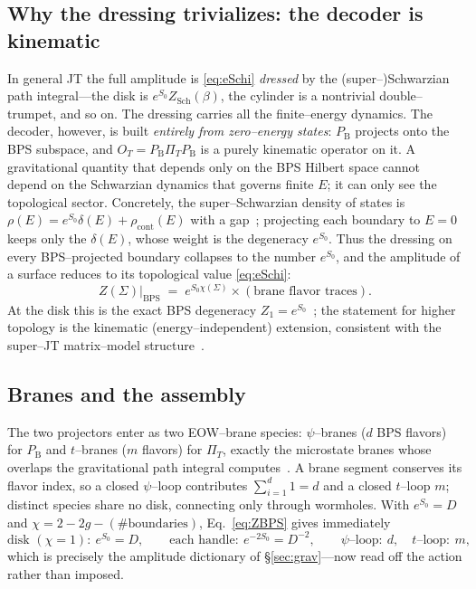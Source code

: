 \documentclass[11pt]{article}
\newcommand{\PB}{P_{\mathrm B}}
\newcommand{\PiT}{\Pi_T}
\newcommand{\OT}{O_T}
\newif\ifpedagogical
\newcommand{\ped}[1]{\ifpedagogical\par\smallskip{\small\color{pedcol}%
  \leftskip=1.4em\rightskip=1.4em\noindent$\triangleright$~\textit{Plain-language aside.}~#1\par}%
  \par\smallskip\fi}
\begin{document}
\subsection{Why the dressing trivializes: the decoder is kinematic}
In general JT the full amplitude is \eqref{eq:eSchi} \emph{dressed} by the (super--)Schwarzian path
integral---the disk is $e^{S_0}Z_{\text{Sch}}(\beta)$, the cylinder is a nontrivial
double--trumpet, and so on. The dressing carries all the finite--energy dynamics. The decoder,
however, is built \emph{entirely from zero--energy states}: $\PB$ projects onto the BPS subspace,
and $\OT=\PB\PiT\PB$ is a purely kinematic operator on it. A gravitational quantity that depends
only on the BPS Hilbert space cannot depend on the Schwarzian dynamics that governs finite $E$; it
can only see the topological sector. Concretely, the super--Schwarzian density of states is
$\rho(E)=e^{S_0}\delta(E)+\rho_{\text{cont}}(E)$ with a gap~\cite{HITZ,N2matrix,BPSmicro};
projecting each boundary to $E=0$ keeps only the $\delta(E)$, whose weight is the degeneracy
$e^{S_0}$.
\ped{The ``super--Schwarzian'' is the theory that lives on the boundary of super--JT; its density of
states $\rho(E)$ tells you how many states sit at each energy. The picture is a spike of $e^{S_0}$
exactly--zero--energy (BPS) states---the $\delta(E)$---then a gap, then an ordinary continuum. Our
decoder only ever asks about the spike, so all the continuum dynamics drops out and only the count
$e^{S_0}$ remains. That is what ``the dressing trivializes'' means.} Thus the dressing on every BPS--projected boundary collapses to the number $e^{S_0}$, and
the amplitude of a surface reduces to its topological value \eqref{eq:eSchi}:
\begin{equation}
  Z(\Sigma)\big|_{\text{BPS}} \;=\; e^{S_0\chi(\Sigma)}\times(\text{brane flavor traces}).
  \label{eq:ZBPS}
\end{equation}
At the disk this is the exact BPS degeneracy $Z_1=e^{S_0}$~\cite{HITZ,BPSmicro}; the statement for
higher topology is the kinematic (energy--independent) extension, consistent with the super--JT
matrix--model structure~\cite{N2matrix}.

\subsection{Branes and the assembly}
The two projectors enter as two EOW--brane species: $\psi$--branes ($d$ BPS flavors) for $\PB$ and
$t$--branes ($m$ flavors) for $\PiT$, exactly the microstate branes whose overlaps the gravitational
path integral computes~\cite{BPSmicro,PSSY}. A brane segment conserves its flavor index, so a closed
$\psi$--loop contributes $\sum_{i=1}^d 1=d$ and a closed $t$--loop $m$; distinct species share no
disk, connecting only through wormholes. With $e^{S_0}=D$ and $\chi=2-2g-(\#\text{boundaries})$,
Eq.~\eqref{eq:ZBPS} gives immediately
\begin{equation}
  \text{disk }(\chi{=}1):\ e^{S_0}=D,\qquad
  \text{each handle}:\ e^{-2S_0}=D^{-2},\qquad
  \psi\text{--loop}:\ d,\quad t\text{--loop}:\ m,
\end{equation}
which is precisely the amplitude dictionary of \S\ref{sec:grav}---now read off the action rather than
imposed.
\end{document}

